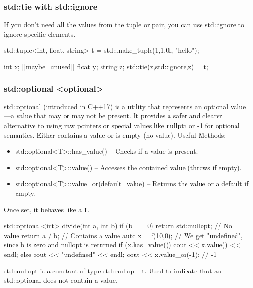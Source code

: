 \documentclass{report}
\begin{document}
     \bigbreak \noindent 
     \subsubsection{std::tie with std::ignore}
     \bigbreak \noindent 
     If you don’t need all the values from the tuple or pair, you can use std::ignore to ignore specific elements.
     \bigbreak \noindent 
     \begin{cppcode}
         std::tuple<int, float, string> t = std::make_tuple(1,1.0f, "hello");

         int x; [[maybe_unused]] float y; string z;
         std::tie(x,std::ignore,z) = t;
     \end{cppcode}

     \bigbreak \noindent 
     \subsubsection{std::optional <optional>}
     \bigbreak \noindent 
     std::optional (introduced in C++17) is a utility that represents an optional value—a value that may or may not be present. It provides a safer and clearer alternative to using raw pointers or special values like nullptr or -1 for optional semantics.
     \bigbreak \noindent 
     Either contains a value or is empty (no value).
     \bigbreak \noindent 
     Useful Methods:
     \begin{itemize}
         \item std::optional<T>::has\_value() – Checks if a value is present.
         \item std::optional<T>::value() – Accesses the contained value (throws if empty).
         \item std::optional<T>::value\_or(default\_value) – Returns the value or a default if empty.
     \end{itemize}
     \bigbreak \noindent 
     Once set, it behaves like a \texttt{T}.
     \bigbreak \noindent 
     \begin{cppcode}
         std::optional<int> divide(int a, int b) {
             if (b == 0) return std::nullopt; // No value
             return a / b; // Contains a value
         }
         auto x = f(10,0);
         // We get "undefined", since b is zero and nullopt is returned
         if (x.has_value()) cout << x.value() << endl;
         else cout << "undefined" << endl;
         cout << x.value_or(-1); // -1
     \end{cppcode}
     \bigbreak \noindent 
     std::nullopt is a constant of type std::nullopt\_t. Used to indicate that an std::optional does not contain a value.
\end{document}
